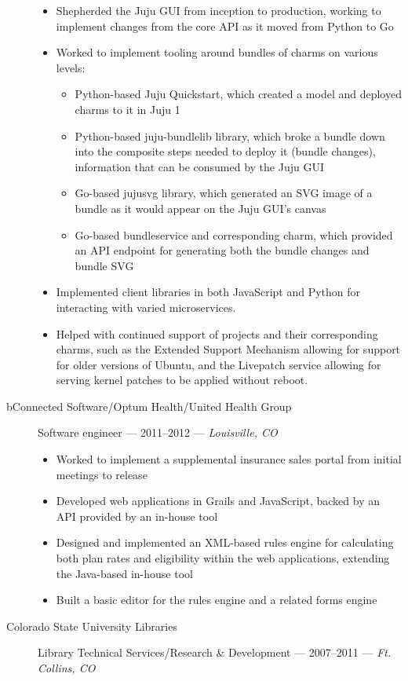 \begin{description}
    \begin{itemize}
        \tightlist
        \item
        Shepherded the Juju GUI from inception to production, working to implement changes from the core API as it moved from Python to Go
        \item
        Worked to implement tooling around bundles of charms on various levels:

        \begin{itemize}
            \tightlist
            \item
            Python-based Juju Quickstart, which created a model and deployed charms to it in Juju 1
            \item
            Python-based juju-bundlelib library, which broke a bundle down into the composite steps needed to deploy it (bundle changes), information that can be consumed by the Juju GUI
            \item
            Go-based jujusvg library, which generated an SVG image of a bundle as it would appear on the Juju GUI's canvas
            \item
            Go-based bundleservice and corresponding charm, which provided an API endpoint for generating both the bundle changes and bundle SVG
        \end{itemize}
        \item
        Implemented client libraries in both JavaScript and Python for interacting with varied microservices.
        \item
        Helped with continued support of projects and their corresponding charms, such as the Extended Support Mechanism allowing for support for older versions of Ubuntu, and the Livepatch service allowing for serving kernel patches to be applied without reboot.
    \end{itemize}
    \item[bConnected Software/Optum Health/United Health Group]
    Software engineer --- 2011--2012 --- \emph{Louisville, CO}

    \begin{itemize}
        \tightlist
        \item
        Worked to implement a supplemental insurance sales portal from initial meetings to release
        \item
        Developed web applications in Grails and JavaScript, backed by an API provided by an in-house tool
        \item
        Designed and implemented an XML-based rules engine for calculating both plan rates and eligibility within the web applications, extending the Java-based in-house tool
        \item
        Built a basic editor for the rules engine and a related forms engine
    \end{itemize}
    \item[Colorado State University Libraries]
    Library Technical Services/Research \& Development --- 2007--2011 --- \emph{Ft. Collins, CO}


\end{description}
